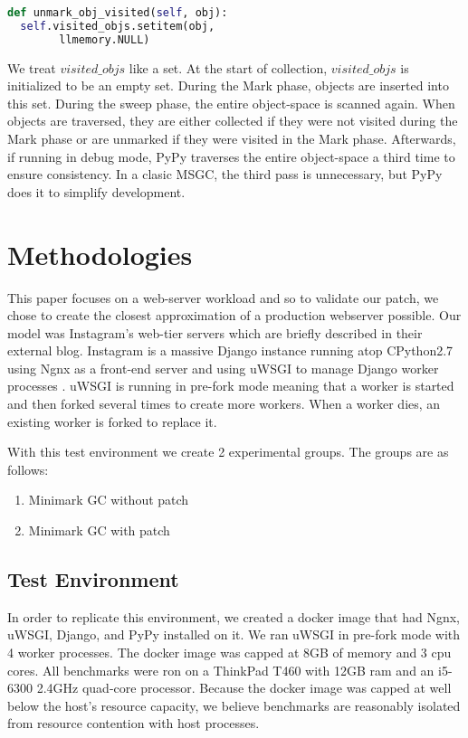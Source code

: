 \documentclass{article}
\begin{document}
\begin{sloppypar}
\begin{lstlisting}[language=python]
def unmark_obj_visited(self, obj):
  self.visited_objs.setitem(obj,
        llmemory.NULL)
\end{lstlisting}

We treat $visited\_objs$ like a set.  At the start of collection, $visited\_objs$ is initialized to be an empty set.  During the Mark phase, objects are inserted into this set.  During the sweep phase, the entire object-space is scanned again.  When objects are traversed, they are either collected if they were not visited during the Mark phase or are unmarked if they were visited in the Mark phase.  Afterwards, if running in debug mode, PyPy traverses the entire object-space a third time to ensure consistency.  In a clasic MSGC, the third pass is unnecessary, but PyPy does it to simplify development.  

\section{Methodologies}\label{sec:method}

This paper focuses on a web-server workload and so to validate our patch, we chose to create the closest approximation of a production webserver possible.  Our model was Instagram's web-tier servers which are briefly described in their external blog.  Instagram is a massive Django instance running atop CPython2.7 using Ngnx as a front-end server and using uWSGI to manage Django worker processes \cite{dismissing_garbage}.  uWSGI is running in pre-fork mode meaning that a worker is started and then forked several times to create more workers.  When a worker dies, an existing worker is forked to replace it.  

With this test environment we create 2 experimental groups.  The groups are as follows:

\begin{enumerate}
    \item Minimark GC without patch
    \item Minimark GC with patch
\end{enumerate}

\subsection{Test Environment}

In order to replicate this environment, we created a docker image that had Ngnx, uWSGI, Django, and PyPy installed on it.  We ran uWSGI in pre-fork mode with 4 worker processes.  The docker image was capped at 8GB of memory and 3 cpu cores.  All benchmarks were ron on a ThinkPad T460 with 12GB ram and an i5-6300 2.4GHz quad-core processor.  Because the docker image was capped at well below the host's resource capacity, we believe benchmarks are reasonably isolated from resource contention with host processes.


\end{sloppypar}
\end{document}
